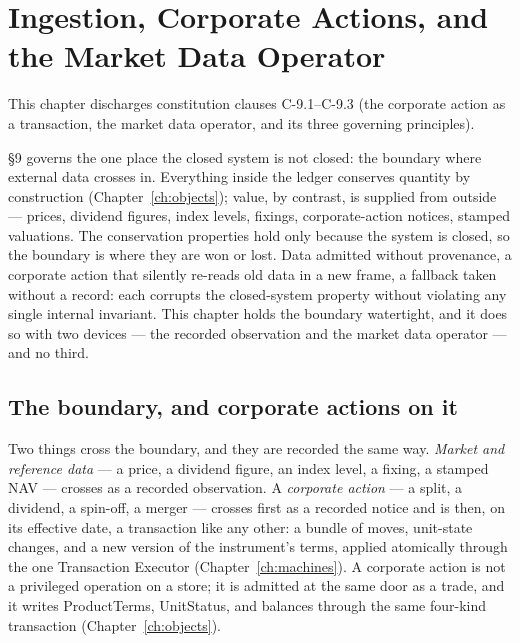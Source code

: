 \section{Ingestion, Corporate Actions, and the Market Data Operator}\label{ch:marketdata}

This chapter discharges constitution clauses C-9.1--C-9.3 (the corporate action as a transaction, the market data operator, and its three governing principles).

\S 9 governs the one place the closed system is not closed: the boundary where external
data crosses in. Everything inside the ledger conserves quantity by construction
(Chapter~\ref{ch:objects}); value, by contrast, is supplied from outside --- prices,
dividend figures, index levels, fixings, corporate-action notices, stamped valuations.
The conservation properties hold only because the system is closed, so the boundary is
where they are won or lost. Data admitted without provenance, a corporate action that
silently re-reads old data in a new frame, a fallback taken without a record: each
corrupts the closed-system property without violating any single internal invariant. This
chapter holds the boundary watertight, and it does so with two devices --- the recorded
observation and the market data operator --- and no third.

\subsection{The boundary, and corporate actions on it}

Two things cross the boundary, and they are recorded the same way. \emph{Market and
reference data} --- a price, a dividend figure, an index level, a fixing, a stamped NAV
--- crosses as a recorded observation. A \emph{corporate action} --- a split, a dividend,
a spin-off, a merger --- crosses first as a recorded notice and is then, on its effective
date, a transaction like any other: a bundle of moves, unit-state changes, and a new
version of the instrument's terms, applied atomically through the one Transaction Executor
(Chapter~\ref{ch:machines}). A corporate action is not a privileged operation on a store;
it is admitted at the same door as a trade, and it writes ProductTerms, UnitStatus, and
balances through the same four-kind transaction (Chapter~\ref{ch:objects}).

